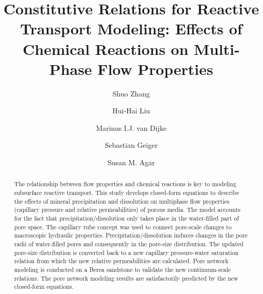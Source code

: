 \documentclass[preprint,12pt,authoryear]{elsarticle}
\begin{document}
\begin{frontmatter}



\title{Constitutive Relations for Reactive Transport Modeling: Effects of Chemical Reactions on Multi-Phase Flow Properties}


\author[rvt]{Shuo Zhang}
\author[rvt]{Hui-Hai Liu}
\author[els]{Marinus I.J. van Dijke}
\author[els]{Sebastian Geiger}
\author[rvt]{Susan M. Agar}
\address[rvt]{Aramco Research Center-Houston, 16300 Park Row Dr. Houston, TX, 77084}
\address[els]{Heriot-Watt University, Edinburgh, EH14 4AS, United Kingdom}

\begin{abstract}
The relationship between flow properties and chemical reactions is key to modeling subsurface reactive transport. This study develops closed-form equations to describe the effects of mineral precipitation and dissolution on multiphase flow properties (capillary pressure and relative permeabilities) of porous media. The model accounts for the fact that precipitation/dissolution only takes place in the water-filled part of pore space. The capillary tube concept was used to connect pore-scale changes to macroscopic hydraulic properties. Precipitation/dissolution induces changes in the pore radii of water-filled pores and consequently in the pore-size distribution. The updated pore-size distribution is converted back to a new capillary pressure-water saturation relation from which the new relative permeabilities are calculated. Pore network modeling is conducted on a Berea sandstone to validate the new continuum-scale relations. The pore network modeling results are satisfactorily predicted by the new closed-form equations.


\end{abstract}
\end{frontmatter}
\end{document}
